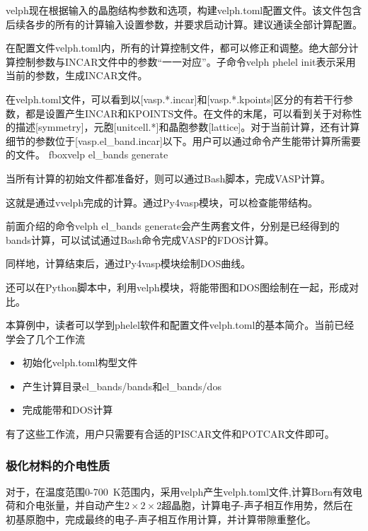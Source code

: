 {\textrm{velph}现在根据输入的晶胞结构参数和选项，构建\textrm{velph.toml}配置文件。该文件包含后续各步的所有的计算输入设置参数，并要求启动计算。建议通读全部计算配置。

在配置文件\textrm{velph.toml}内，所有的计算控制文件，都可以修正和调整。绝大部分计算控制参数与\textrm{INCAR}文件中的参数``一一对应''。子命令\textrm{velph phelel init}表示采用当前的参数，生成\textrm{INCAR}文件。

在\textrm{velph.toml}文件，可以看到以\textrm{[vasp.*.incar]}和\textrm{[vasp.*.kpoints]}区分的有若干行参数，都是设置产生\textrm{INCAR}和\textrm{KPOINTS}文件。在文件的末尾，可以看到关于对称性的描述\textrm{[symmetry]}，元胞\textrm{[unitcell.*]}和晶胞参数\textrm{[lattice]}。对于当前计算，还有计算细节的参数位于\textrm{[vasp.el\_band.incar]}以下。用户可以通过命令产生能带计算所需要的文件。
fbox{\textrm{velp el\_bands generate}}

当所有计算的初始文件都准备好，则可以通过\textrm{Bash}脚本，完成\textrm{VASP}计算。

这就是通过\textrm{vvelph}完成的计算。通过\textrm{Py4vasp}模块，可以检查能带结构。

前面介绍的命令\textrm{velph el\_bands generate}会产生两套文件，分别是已经得到的\textrm{bands}计算，可以试试通过\textrm{Bash}命令完成\textrm{VASP}的F\textrm{DOS}计算。

同样地，计算结束后，通过\textrm{Py4vasp}模块绘制\textrm{DOS}曲线。

还可以在\textrm{Python}脚本中，利用\textrm{velph}模块，将能带图和\textrm{DOS}图绘制在一起，形成对比。

本算例中，读者可以学到\textrm{phelel}软件和配置文件\textrm{velph.toml}的基本简介。当前已经学会了几个工作流
\begin{itemize}
	\item 初始化\textrm{velph.toml}构型文件
	\item 产生计算目录\textrm{el\_bands/bands}和\textrm{el\_bands/dos}
	\item 完成能带和\textrm{DOS}计算
\end{itemize}
有了这些工作流，用户只需要有合适的\textrm{PISCAR}文件和\textrm{POTCAR}文件即可。


\subsubsection{极化材料的介电性质}
对于，在温度范围\textrm{0-700~K}范围内，采用\textrm{velph}产生\textrm{velph.toml}文件,计算\textrm{Born}有效电荷和介电张量，并自动产生$2\times2\times2$超晶胞，计算电子-声子相互作用势，然后在初基原胞中，完成最终的电子-声子相互作用计算，并计算带隙重整化。

}
